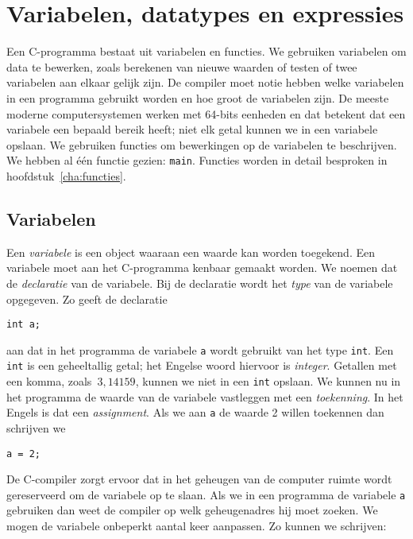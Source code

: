 \chapter{Variabelen, datatypes en expressies}
\label{cha:vardatexp}
\thispagestyle{empty}

Een C-programma bestaat uit variabelen en functies. We gebruiken variabelen om data te bewerken, zoals berekenen van nieuwe waarden of testen of twee variabelen aan elkaar gelijk zijn. De compiler moet notie hebben welke variabelen in een programma gebruikt worden en hoe groot de variabelen zijn. De meeste moderne computersystemen werken met 64-bits eenheden en dat betekent dat een variabele een bepaald bereik heeft; niet elk getal kunnen we in een variabele opslaan.
We gebruiken functies om bewerkingen op de variabelen te beschrijven. We hebben al één functie gezien: \texttt{main}. Functies worden in detail besproken in hoofdstuk~\ref{cha:functies}.


\section{Variabelen}
Een \textsl{variabele} is een object waaraan een waarde kan worden toegekend. Een variabele moet aan het C-programma kenbaar gemaakt worden. We noemen dat de \textsl{declaratie} van de variabele. Bij de declaratie wordt het \textsl{type} van de variabele opgegeven. Zo geeft de declaratie

\hspace*{1em}\texttt{int a;}

aan dat in het programma de variabele \texttt{a} wordt gebruikt van het type \texttt{int}. Een \texttt{int} is een geheeltallig getal; het Engelse woord hiervoor is \textsl{integer}. Getallen met een komma, zoals~$3,14159$, kunnen we niet in een \texttt{int} opslaan. We kunnen nu in het programma de waarde van de variabele vastleggen met een \textsl{toekenning}. In het Engels is dat een \textsl{assignment}. Als we aan \texttt{a} de waarde 2 willen toekennen dan schrijven we

\hspace*{1em}\texttt{a = 2;}

De C-compiler zorgt ervoor dat in het geheugen van de computer ruimte wordt gereserveerd om de variabele op te slaan. Als we in een programma de variabele \texttt{a} gebruiken dan weet de compiler op welk geheugenadres hij moet zoeken. We mogen de variabele onbeperkt aantal keer aanpassen. Zo kunnen we schrijven:

